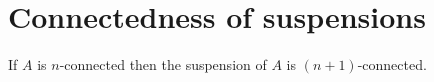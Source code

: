 \documentclass[hott-all.tex]{subfiles}
\begin{document}
\section{Connectedness of suspensions}
% 
% 
\begin{thm} 
  If $A$ is $n$-connected then the suspension of $A$ is $(n+1)$-connected.
\end{thm}
% 
\end{document}
